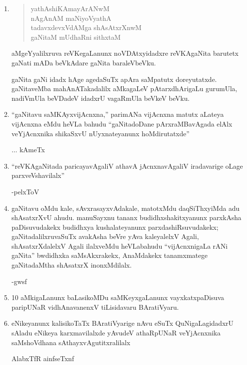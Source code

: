 \begin{enumerate}[\rm 1)]
\item
\begin{center} 
\begin{verse}
yathAshiKAmayArANwM\\
nAgAnAM maNiyoVyathA\\
tadavxdevxVdAMga shAsAtxrXnwM\\
gaNitaM mUdhaRni sithxtaM
\end{verse}
\end{center}
aMgeYyalilxruva reVKegaLanunx noVDAtxyidadxre reVKAgaNita barutetx gaNati mADa beVkAdare gaNita baraleVbeVku.

gaNita gaNi idadx hAge agedaSuTx apAra saMpatutx doreyutatxde. gaNitaveMba mahAnATakadalilx aMkagaLeV pAtarxdhArigaLu gurumUla, nadiVmUla beVDadeV idadxrU vagaRmUla beVkeV beVku.

\item ``gaNitavu saMKAyxvijAcnxna,'' parimANa vijAcnxna matutx aLateya vijAcnxna eMdu heVLa bahudu ``gaNitadoDane pArxraMBavAgada elAlx veYjAcnxnika shikaSxvU nUyxnateyanunx hoMdirutatxde'' 
\begin{flushright}
$\ldots$  kAmeTx
\end{flushright}

\item ``reVKAgaNitada paricayavAgaliV athavA jAcnxnavAgaliV iradavarige oLage parxveVshavilalx''
\begin{flushright}
-pelxToV
\end{flushright}

\item gaNitavu oMdu kale, sAvxrasayxvAdakale, matotxMdu daqSiThxyiMda adu shAsatxrXvU ahudu. manuSayxnu tananx budidhxshakitxyanunx parxkAsha paDisuvudakekx budidhxya kushalateyanunx parxdashiRsuvudakekx; gaNitadalilxruvaSuTx avakAsha beVre yAva kaleyalelxV Agali, shAsatxrXdalelxV Agali ilalxveMdu heVLabahudu ``vijAcnxnigaLa rANi gaNita'' bwdidhxka saMsAkxrakekx, AnaMdakekx tanamxmatege gaNitadaMtha shAsatxrX inonxMdilalx.
\begin{flushright}
-gwsf
\end{flushright}

\item {\rm 10} aMkigaLanunx baLasikoMDu saMKeyxgaLanunx vayxkatxpaDisuva paripUNaR vidhAnavanenxV tiLisidavaru BAratiVyaru.

\item eNikeyanunx kalisikoTaTx BAratiVyarige nAvu eSuTx QuNigaLagidadxrU sAladu eNikeya karxmavilalxde yAvudeV athaRpUNaR veYjAcnxnika saMshoVdhana sAthayxvAgutitxralilalx
\begin{flushright}
AlabxTfR ainfseTxnf
\end{flushright}
\end{enumerate}

